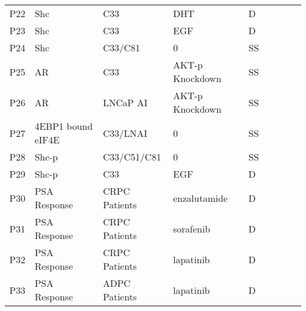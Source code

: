 \begin{center}
\begin{scriptsize}
\begin{supertabular}{l l l l l l l l l }
P22  & Shc & C33 & DHT  & D & \cite{Veeramani2005Onc}\\
P23  & Shc & C33 & EGF  & D & \cite{Veeramani2005Onc}\\
P24  & Shc & C33/C81 & 0  & SS & \cite{Veeramani2005Onc}\\
P25  & AR & C33 & AKT-p Knockdown  & SS & \cite{Ha2011}\\
P26  & AR & LNCaP AI & AKT-p Knockdown  & SS & \cite{Ha2011}\\
P27  & 4EBP1 bound eIF4E & C33/LNAI & 0  & SS & \cite{Graff2009}\\
P28  & Shc-p & C33/C51/C81 & 0 & SS & \cite{Lee2004}\\
P29  & Shc-p & C33 & EGF & D & \cite{Lee2004}\\
P30  & PSA Response & CRPC Patients & enzalutamide & D & \cite{Scher2012}\\
P31  & PSA Response & CRPC Patients & sorafenib & D & \cite{Dahut2008}\\
P32  & PSA Response & CRPC Patients & lapatinib & D & \cite{Whang2013}\\
P33  & PSA Response & ADPC Patients & lapatinib & D & \cite{Liu2013}\\

\end{supertabular}
\end{scriptsize}
\end{center}
%
 
 

 
 
 
 
 
 
 
 

  
 
  
   


 
 
 
 
 
 
 
 
 
 
 
 
 
 
 
 
 
